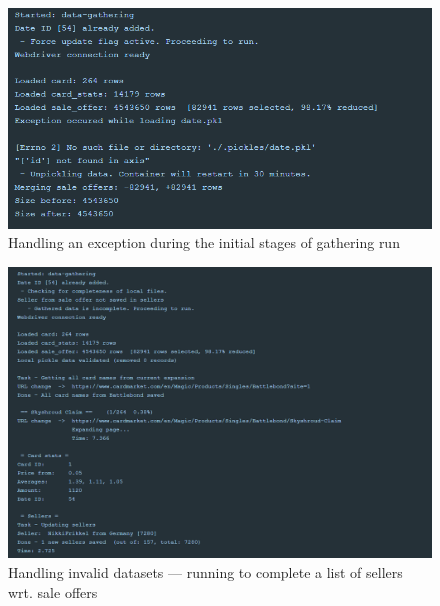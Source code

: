 \begin{figure}
    \centering
    \includegraphics[width=\textwidth]{figures/exception_handling.png}
    \caption{Handling an exception during the initial stages of gathering run}
    \label{fig:exception_handling}
\end{figure}

\begin{figure}
    \centering
    \includegraphics[width=\textwidth]{figures/unknown_seller.png}
    \caption{Handling invalid datasets --- running to complete a list of sellers wrt. sale offers}
    \label{fig:unknown_seller}
\end{figure}

